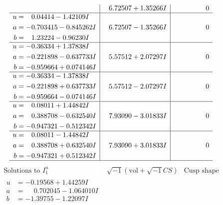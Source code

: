 \documentclass[1p]{elsarticle_modified}
\theoremstyle{definition}
\newcommand{\I}{\sqrt{-1}}
\begin{document}
$$\begin{array}{c|c|c}
 & \phantom{-}6.72507 + 1.35266 I & \phantom{-0.000000 } 0 \\ \hline\begin{aligned}
u &= \phantom{-}0.04414 - 1.42109 I \\
a &= -0.703415 - 0.845262 I \\
b &= \phantom{-}1.23224 - 0.96230 I\end{aligned}
 & \phantom{-}6.72507 - 1.35266 I & \phantom{-0.000000 } 0 \\ \hline\begin{aligned}
u &= -0.36334 + 1.37838 I \\
a &= -0.221898 - 0.637733 I \\
b &= -0.959664 + 0.074146 I\end{aligned}
 & \phantom{-}5.57512 + 2.07297 I & \phantom{-0.000000 } 0 \\ \hline\begin{aligned}
u &= -0.36334 - 1.37838 I \\
a &= -0.221898 + 0.637733 I \\
b &= -0.959664 - 0.074146 I\end{aligned}
 & \phantom{-}5.57512 - 2.07297 I & \phantom{-0.000000 } 0 \\ \hline\begin{aligned}
u &= \phantom{-}0.08011 + 1.44842 I \\
a &= \phantom{-}0.388708 - 0.632540 I \\
b &= -0.947321 - 0.512342 I\end{aligned}
 & \phantom{-}7.93090 - 3.01833 I & \phantom{-0.000000 } 0 \\ \hline\begin{aligned}
u &= \phantom{-}0.08011 - 1.44842 I \\
a &= \phantom{-}0.388708 + 0.632540 I \\
b &= -0.947321 + 0.512342 I\end{aligned}
 & \phantom{-}7.93090 + 3.01833 I & \phantom{-0.000000 } 0\\
 \hline 
 \end{array}$$\newpage$$\begin{array}{c|c|c}  
\text{Solutions to }I^u_{1}& \I (\text{vol} + \sqrt{-1}CS) & \text{Cusp shape}\\
 \hline 
\begin{aligned}
u &= -0.19568 + 1.44259 I \\
a &= \phantom{-}0.702045 - 1.064010 I \\
b &= -1.39755 - 1.22097 I\end{aligned}

\end{array}$$
\end{document}
